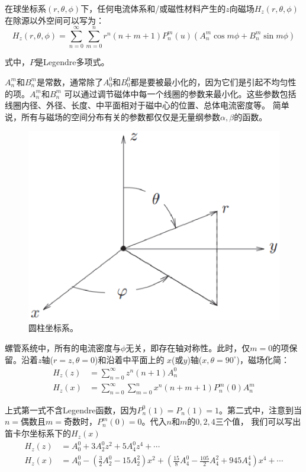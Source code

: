在球坐标系$(r,\theta,\phi)$下，任何电流体系和/或磁性材料产生的$z$向磁场$H_z(r,\theta,\phi)$在除源以外空间可以写为：
\begin{equation}\label{eqn:solenoid coil hz}
  H_z (r,\theta,\phi)=\sum_{n=0}^\infty \sum_{m=0}^n r^n (n+m+1) P_n^m(u)(A_n^m\cos m\phi+B_n^m\sin m\phi)
\end{equation}

式中，$P$是Legendre多项式。

$A_n^m$和$B_n^m$是常数，通常除了$A_0^0$和$B_0^0$都是要被最小化的，因为它们是引起不均匀性的项。$A_n^m$和$B_n^m$
可以通过调节磁体中每一个线圈的参数来最小化。这些参数包括线圈内径、外径、长度、中平面相对于磁中心的位置、总体电流密度等。
简单说，所有与磁场的空间分布有关的参数都仅仅是无量纲参数$\alpha, \beta$的函数。
\begin{figure}[htbp]
	\centering
	\includegraphics[scale=0.5]{chpt3/figs/fig3.4.eps}
	\caption{圆柱坐标系。}
\end{figure}

螺管系统中，所有的电流密度与$\phi$无关，即存在轴对称性。此时，仅$m=0$的项保留。沿着$z$轴($r=z,\theta=0$)和沿着中平面上的
$x$(或$y$)轴($x,\theta=90^\circ$)，磁场化简：
\begin{subequations}\label{eqn:solenoid coil hz1}
\begin{align}
H_z(z)&=\sum_{n=0}^\infty z^n(n+1)A_n^0 \\
H_z(x)&=\sum_{n=0}^\infty \sum_{m=0}^n x^n(n+m+1)P_n^m(0)A_n^m
\end{align}
\end{subequations}

上式第一式不含Legendre函数，因为$P_n^0(1)=P_n(1)=1$。第二式中，注意到当$n=$偶数且$m=$奇数时，$ P_n^m(0)=0$。代入$n$和$m$的$0,2,4$三个值，
我们可以写出笛卡尔坐标系下的$H_z(x)$
\begin{subequations}\label{eqn:solenoid coil hz2}
	\begin{align}
H_z(z)&=A_0^0+3A_2^0z^2+5A_4^0z^4+\cdots\\
H_z(x)&=A_0^0-(\frac{3}{2}A_2^0-15A_2^2)x^2+(\frac{15}{8}A_4^0-\frac{105}{2}A_4^2+945A_4^4)x^4+\cdots
\end{align}
\end{subequations}

